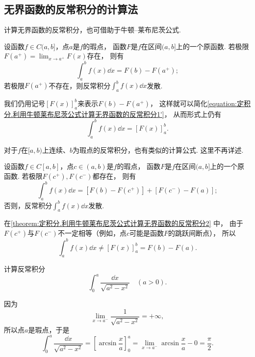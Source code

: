 \subsection{无界函数的反常积分的计算法}
计算无界函数的反常积分，也可借助于牛顿--莱布尼茨公式.
\begin{theorem}\label{theorem:定积分.利用牛顿莱布尼茨公式计算无界函数的反常积分1}
设函数\(f \in C(a,b]\)，点\(a\)是\(f\)的瑕点，
函数\(F\)是\(f\)在区间\((a,b]\)上的一个原函数.
若极限\(F(a^+) = \lim_{x \to a^+} F(x)\)存在，
则有
\begin{equation}\label{equation:定积分.利用牛顿莱布尼茨公式计算无界函数的反常积分1'}
	\int_a^b f(x) \dd{x}
	= F(b) - F(a^+);
\end{equation}
若极限\(F(a^+)\)不存在，则反常积分\(\int_a^b f(x) \dd{x}\)发散.
\end{theorem}
我们仍用记号\([F(x)]_a^b\)来表示\(F(b) - F(a^+)\)，
这样就可以简化\cref{equation:定积分.利用牛顿莱布尼茨公式计算无界函数的反常积分1'}，
从而形式上仍有
\begin{equation}\label{equation:定积分.利用牛顿莱布尼茨公式计算无界函数的反常积分1}
	\int_a^b f(x) \dd{x} = [F(x)]_a^b.
\end{equation}

对于\(f\)在\([a,b)\)上连续、\(b\)为瑕点的反常积分，也有类似的计算公式.
这里不再详述.

\begin{theorem}\label{theorem:定积分.利用牛顿莱布尼茨公式计算无界函数的反常积分2}
设函数\(f \in C[a,b]\)，点\(c\in(a,b)\)是\(f\)的瑕点，
函数\(F\)是\(f\)在区间\((a,b]\)上的一个原函数.
若极限\(F(c^+),F(c^-)\)都存在，
则有
\begin{equation}\label{equation:定积分.利用牛顿莱布尼茨公式计算无界函数的反常积分2}
	\int_a^b f(x) \dd{x}
	= [F(b) - F(c^+)] + [F(c^-) - F(a)];
\end{equation}
否则，反常积分\(\int_a^b f(x) \dd{x}\)发散.
\end{theorem}
在\cref{theorem:定积分.利用牛顿莱布尼茨公式计算无界函数的反常积分2} 中，
由于\(F(c^+)\)与\(F(c^-)\)不一定相等（例如，点\(c\)可能是函数\(F\)的跳跃间断点），
所以\[
	\int_a^b f(x) \dd{x}
	\neq [F(x)]_a^b = F(b) - F(a).
\]

\begin{example}
计算反常积分\[
	\int_0^a \frac{\dd{x}}{\sqrt{a^2-x^2}}
	\quad(a>0).
\]
\begin{solution}
因为\[
	\lim_{x \to a^-} \frac{1}{\sqrt{a^2-x^2}} = +\infty,
\]
所以点\(a\)是瑕点，于是\[
	\int_0^a \frac{\dd{x}}{\sqrt{a^2-x^2}}
	= \left[ \arcsin\frac{x}{a} \right]_0^a
	= \lim_{x \to a^-} \arcsin\frac{x}{a} - 0 = \frac{\pi}{2}.
\]
\end{solution}
\end{example}


